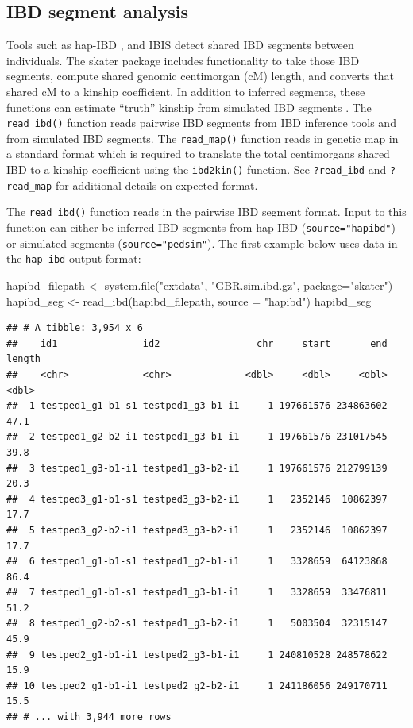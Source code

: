 \documentclass[9pt,a4paper,]{extarticle}
\newenvironment{Shaded}{\begin{snugshade}}{\end{snugshade}}
\newcommand{\AttributeTok}[1]{\textcolor[rgb]{0.77,0.63,0.00}{#1}}
\newcommand{\FunctionTok}[1]{\textcolor[rgb]{0.00,0.00,0.00}{#1}}
\newcommand{\NormalTok}[1]{#1}
\newcommand{\OtherTok}[1]{\textcolor[rgb]{0.56,0.35,0.01}{#1}}
\newcommand{\StringTok}[1]{\textcolor[rgb]{0.31,0.60,0.02}{#1}}
\begin{document}
\hypertarget{ibd-segment-analysis}{%
\subsection{IBD segment analysis}\label{ibd-segment-analysis}}

Tools such as hap-IBD \citep{zhou2020}, and IBIS \citep{seidman2020} detect shared IBD segments between individuals. The skater package includes functionality to take those IBD segments, compute shared genomic centimorgan (cM) length, and converts that shared cM to a kinship coefficient. In addition to inferred segments, these functions can estimate ``truth'' kinship from simulated IBD segments \citep{caballero2019}. The \texttt{read\_ibd()} function reads pairwise IBD segments from IBD inference tools and from simulated IBD segments. The \texttt{read\_map()} function reads in genetic map in a standard format which is required to translate the total centimorgans shared IBD to a kinship coefficient using the \texttt{ibd2kin()} function. See \texttt{?read\_ibd} and \texttt{?read\_map} for additional details on expected format.

The \texttt{read\_ibd()} function reads in the pairwise IBD segment format. Input to this function can either be inferred IBD segments from hap-IBD (\texttt{source="hapibd"}) or simulated segments (\texttt{source="pedsim"}). The first example below uses data in the \texttt{hap-ibd} output format:

\begin{Shaded}
\begin{Highlighting}[]
\NormalTok{hapibd\_filepath }\OtherTok{\textless{}{-}} \FunctionTok{system.file}\NormalTok{(}\StringTok{"extdata"}\NormalTok{, }\StringTok{"GBR.sim.ibd.gz"}\NormalTok{, }
                               \AttributeTok{package=}\StringTok{"skater"}\NormalTok{)}
\NormalTok{hapibd\_seg }\OtherTok{\textless{}{-}} \FunctionTok{read\_ibd}\NormalTok{(hapibd\_filepath, }\AttributeTok{source =} \StringTok{"hapibd"}\NormalTok{)}
\NormalTok{hapibd\_seg}
\end{Highlighting}
\end{Shaded}

\begin{verbatim}
## # A tibble: 3,954 x 6
##    id1               id2                 chr     start       end length
##    <chr>             <chr>             <dbl>     <dbl>     <dbl>  <dbl>
##  1 testped1_g1-b1-s1 testped1_g3-b1-i1     1 197661576 234863602   47.1
##  2 testped1_g2-b2-i1 testped1_g3-b1-i1     1 197661576 231017545   39.8
##  3 testped1_g3-b1-i1 testped1_g3-b2-i1     1 197661576 212799139   20.3
##  4 testped3_g1-b1-s1 testped3_g3-b2-i1     1   2352146  10862397   17.7
##  5 testped3_g2-b2-i1 testped3_g3-b2-i1     1   2352146  10862397   17.7
##  6 testped1_g1-b1-s1 testped1_g2-b1-i1     1   3328659  64123868   86.4
##  7 testped1_g1-b1-s1 testped1_g3-b1-i1     1   3328659  33476811   51.2
##  8 testped1_g2-b2-s1 testped1_g3-b2-i1     1   5003504  32315147   45.9
##  9 testped2_g1-b1-i1 testped2_g3-b1-i1     1 240810528 248578622   15.9
## 10 testped2_g1-b1-i1 testped2_g2-b2-i1     1 241186056 249170711   15.5
## # ... with 3,944 more rows
\end{verbatim}
\end{document}
